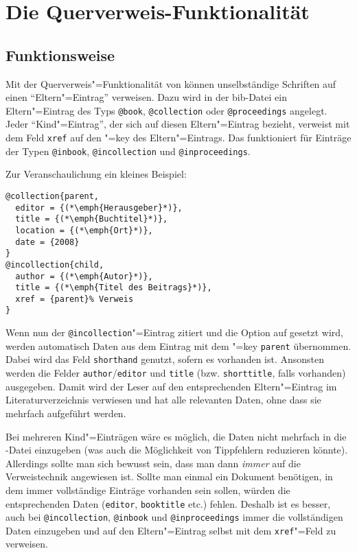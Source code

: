\documentclass[ngerman]{scrartcl}
\begin{document}
\section{Die Querverweis-Funktionalität}
\label{xreffunctionality}
\subsection{Funktionsweise}
Mit der Querverweis"=Funktionalität von \bldw{} können unselbständige 
Schriften auf einen \enquote{Eltern"=Eintrag} verweisen.
Dazu wird in der bib-Datei ein Eltern"=Eintrag des Typs \texttt{@book}, \texttt{@collection}
oder \texttt{@proceedings} angelegt. Jeder \enquote{Kind"=Eintrag}, der sich auf diesen
Eltern"=Eintrag bezieht, verweist mit dem Feld \texttt{xref} auf den \BibTeX"=key des
Eltern"=Eintrags. Das funktioniert für Einträge der Typen \texttt{@inbook}, 
\texttt{@incollection} und \texttt{@inproceedings}.

Zur Veranschaulichung ein kleines Beispiel: 
\begin{lstlisting}
@collection{parent,
  editor = {(*\emph{Herausgeber}*)},
  title = {(*\emph{Buchtitel}*)},
  location = {(*\emph{Ort}*)},
  date = {2008}
}
@incollection{child,
  author = {(*\emph{Autor}*)},
  title = {(*\emph{Titel des Beitrags}*)},
  xref = {parent}% Verweis
}
\end{lstlisting}
Wenn nun der \texttt{@incollection}"=Eintrag zitiert und die Option  auf
 gesetzt wird, werden automatisch 
Daten aus dem Eintrag mit dem \BibTeX"=key \texttt{parent} übernommen. Dabei wird das Feld
\texttt{shorthand} genutzt, sofern es vorhanden ist. Ansonsten werden die Felder 
\texttt{author}\slash\texttt{editor} und \texttt{title} (bzw. \texttt{shorttitle},
falls vorhanden) ausgegeben. Damit wird der Leser auf den entsprechenden Eltern"=Eintrag
im Literaturverzeichnis verwiesen und hat alle relevanten Daten, ohne dass sie
mehrfach aufgeführt werden. 

Bei mehreren Kind"=Einträgen wäre es möglich, die Daten nicht mehrfach in die 
\BibTeX-Datei einzugeben (was auch die Möglichkeit von Tippfehlern reduzieren könnte). 
Allerdings sollte man sich bewusst sein, dass man dann \emph{immer} auf die
Verweistechnik angewiesen ist. Sollte man einmal ein Dokument benötigen, in dem
immer vollständige Einträge vorhanden sein sollen, würden die entsprechenden Daten
(\texttt{editor}, \texttt{booktitle} etc.) fehlen. Deshalb ist es besser, auch
bei \texttt{@incollection}, \texttt{@inbook} und \texttt{@inproceedings} immer
die vollständigen Daten einzugeben und auf den Eltern"=Eintrag selbst mit dem
\texttt{xref}"=Feld zu verweisen. 
\end{document}
